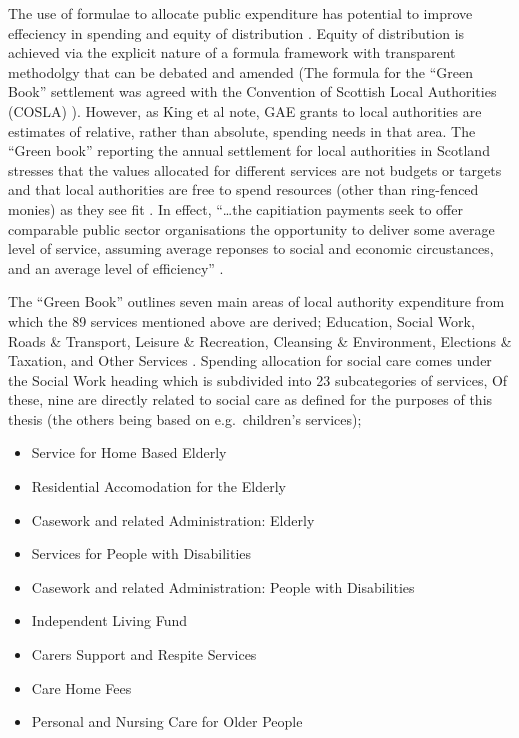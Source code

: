 \documentclass[12pt,]{report}
\begin{document}
The use of formulae to allocate public expenditure has potential to
improve effeciency in spending and equity of distribution \citep{RN444}.
Equity of distribution is achieved via the explicit nature of a formula
framework with transparent methodolgy that can be debated and amended
\citep{RN444} (The formula for the ``Green Book'' settlement was agreed
with the Convention of Scottish Local Authorities (COSLA)
\citep{RN448}). However, as King et al \citeyearpar{RN445} note, GAE
grants to local authorities are estimates of relative, rather than
absolute, spending needs in that area. The ``Green book'' reporting the
annual settlement for local authorities in Scotland stresses that the
values allocated for different services are not budgets or targets and
that local authorities are free to spend resources (other than
ring-fenced monies) as they see fit \citep{RN450}. In effect,
``\ldots{}the capitiation payments seek to offer comparable public
sector organisations the opportunity to deliver some average level of
service, assuming average reponses to social and economic circustances,
and an average level of efficiency'' \citep[pp.309]{RN444}.

The ``Green Book'' outlines seven main areas of local authority
expenditure from which the 89 services mentioned above are derived;
Education, Social Work, Roads \& Transport, Leisure \& Recreation,
Cleansing \& Environment, Elections \& Taxation, and Other Services
\citep{RN450}. Spending allocation for social care comes under the
Social Work heading which is subdivided into 23 subcategories of
services, Of these, nine are directly related to social care as defined
for the purposes of this thesis (the others being based on
e.g.~children's services);

\begin{itemize}[noitemsep]
\item Service for Home Based Elderly
\item Residential Accomodation for the Elderly
\item Casework and related Administration: Elderly
\item Services for People with Disabilities
\item Casework and related Administration: People with Disabilities
\item Independent Living Fund
\item Carers Support and Respite Services
\item Care Home Fees
\item Personal and Nursing Care for Older People
\end{itemize}
\end{document}

